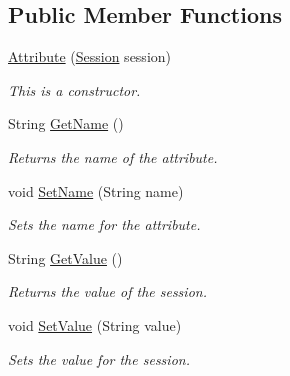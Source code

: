 \subsection*{Public Member Functions}
\begin{DoxyCompactItemize}
\item 
\hyperlink{classcom_1_1shephertz_1_1app42_1_1paas_1_1sdk_1_1csharp_1_1session_1_1_session_1_1_attribute_aeef35f9f53ca225f59590fd617cf0609}{Attribute} (\hyperlink{classcom_1_1shephertz_1_1app42_1_1paas_1_1sdk_1_1csharp_1_1session_1_1_session}{Session} session)
\begin{DoxyCompactList}\small\item\em This is a constructor. \end{DoxyCompactList}\item 
String \hyperlink{classcom_1_1shephertz_1_1app42_1_1paas_1_1sdk_1_1csharp_1_1session_1_1_session_1_1_attribute_a872c82162829a9b700bf5016e746c5a5}{Get\+Name} ()
\begin{DoxyCompactList}\small\item\em Returns the name of the attribute. \end{DoxyCompactList}\item 
void \hyperlink{classcom_1_1shephertz_1_1app42_1_1paas_1_1sdk_1_1csharp_1_1session_1_1_session_1_1_attribute_aa6b8fee14b00302abfc9726f9a7cd254}{Set\+Name} (String name)
\begin{DoxyCompactList}\small\item\em Sets the name for the attribute. \end{DoxyCompactList}\item 
String \hyperlink{classcom_1_1shephertz_1_1app42_1_1paas_1_1sdk_1_1csharp_1_1session_1_1_session_1_1_attribute_a20aa9f93c8740d168279f33af409e72e}{Get\+Value} ()
\begin{DoxyCompactList}\small\item\em Returns the value of the session. \end{DoxyCompactList}\item 
void \hyperlink{classcom_1_1shephertz_1_1app42_1_1paas_1_1sdk_1_1csharp_1_1session_1_1_session_1_1_attribute_a4b5d8a77dbeae968a66e0f99e4b4c53b}{Set\+Value} (String value)
\begin{DoxyCompactList}\small\item\em Sets the value for the session. \end{DoxyCompactList}\end{DoxyCompactItemize}
